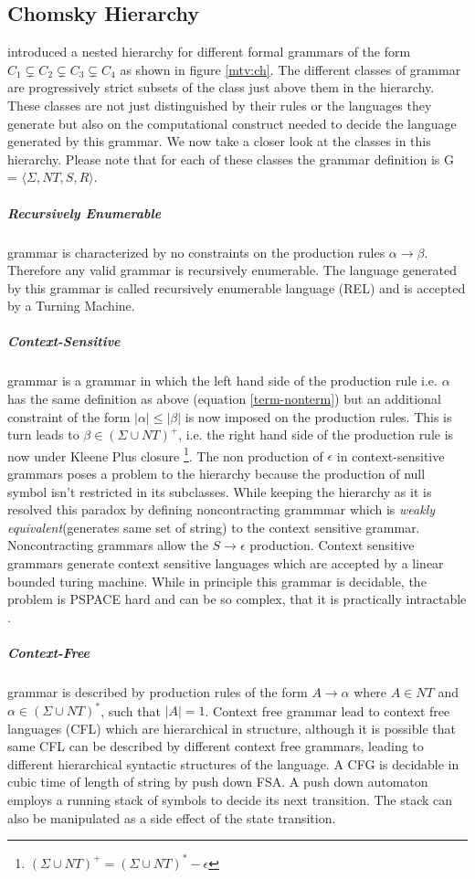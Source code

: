 \subsection{Chomsky Hierarchy}\label{flt:ch}
\cite{Chomsky1956} introduced a nested hierarchy for different formal grammars of the form $C_1 \subsetneq C_2 \subsetneq C_3 \subsetneq C_4$ as shown in figure \ref{mtv:ch}. The different classes of grammar are progressively strict subsets of the class just above them in the hierarchy. These classes are not just distinguished by their rules or the languages they generate but also on the computational construct needed to decide the language generated by this grammar. We now take a closer look at the classes in this hierarchy. Please note that for each of these classes the grammar definition is G = $\langle \Sigma, NT, S, R \rangle$.
\subparagraph{Recursively Enumerable}grammar is characterized by no constraints on the production rules $\alpha \rightarrow \beta$. Therefore any valid grammar is recursively enumerable. The language generated by this grammar is called recursively enumerable language (REL) and is accepted by a Turning Machine.
\subparagraph{Context-Sensitive}grammar is a grammar in which the left hand side of the production rule i.e. $\alpha$ has the same definition as above (equation \ref{term-nonterm}) but an additional constraint of the form $|\alpha| \leq |\beta|$ is now imposed on the production rules. This is turn leads to $\beta \in (\Sigma \cup NT)^{+}$, i.e. the right hand side of the production rule is now under Kleene Plus closure \footnote{$(\Sigma \cup NT)^{+} = (\Sigma \cup NT)^{*} - \epsilon$}. The non production of $\epsilon$ in context-sensitive grammars poses a problem to the hierarchy because the production of null symbol isn't restricted in its subclasses. While keeping the hierarchy as it is \cite{Chomsky1963} resolved this paradox by defining noncontracting grammmar which is \textit{weakly equivalent}(generates same set of string) to the context sensitive grammar. Noncontracting grammars allow the $S \rightarrow \epsilon$ production. Context sensitive grammars generate context sensitive languages which are accepted by a linear bounded turing machine. While in principle this grammar is decidable, the problem is PSPACE hard and can be so complex, that it is practically intractable \citep{Jager2012}. 
\subparagraph{Context-Free}grammar is described by production rules of the form $A \rightarrow \alpha$ where $A \in NT$ and $\alpha \in (\Sigma \cup NT)^{*}$, such that $|A|=1$.  Context free grammar lead to context free languages (CFL) which are hierarchical in structure, although it is possible that same CFL can be described by different context free grammars, leading to different hierarchical syntactic structures of the language. A CFG is decidable in cubic time of length of string by push down FSA. A push down automaton employs a running stack of symbols to decide its next transition. The stack can also be manipulated as a side effect of the state transition.
